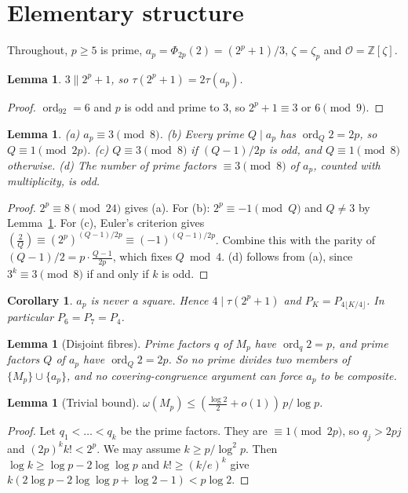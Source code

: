 \documentclass[11pt]{amsart}
\newtheorem{lemma}[theorem]{Lemma}
\newtheorem{corollary}[theorem]{Corollary}
\theoremstyle{definition}
\theoremstyle{remark}
\newcommand{\ord}{\operatorname{ord}}
\newcommand{\cO}{\mathcal{O}}
\newcommand{\Z}{\mathbb{Z}}
\begin{document}
\section{Elementary structure}
Throughout, $p\ge5$ is prime, $a_p=\Phi_{2p}(2)=(2^p+1)/3$, $\zeta=\zeta_p$ and $\cO=\Z[\zeta]$.

\begin{lemma}\label{lem:3part}
$3\parallel2^p+1$, so $\tau(2^p+1)=2\tau(a_p)$.
\end{lemma}
\begin{proof}
$\ord_92=6$ and $p$ is odd and prime to $3$, so $2^p+1\equiv3$ or $6\pmod9$.
\end{proof}

\begin{lemma}\label{lem:mod8}
(a) $a_p\equiv3\pmod8$. (b) Every prime $Q\mid a_p$ has $\ord_Q2=2p$, so $Q\equiv1\pmod{2p}$.
(c) $Q\equiv3\pmod8$ if $(Q-1)/2p$ is odd, and $Q\equiv1\pmod8$ otherwise.
(d) The number of prime factors $\equiv3\pmod8$ of $a_p$, counted with multiplicity, is odd.
\end{lemma}
\begin{proof}
$2^p\equiv8\pmod{24}$ gives (a). For (b): $2^p\equiv-1\pmod Q$ and $Q\ne3$ by Lemma~\ref{lem:3part}.
For (c), Euler's criterion gives $(\frac2Q)\equiv(2^p)^{(Q-1)/2p}\equiv(-1)^{(Q-1)/2p}$. Combine this with the parity
of $(Q-1)/2=p\cdot\frac{Q-1}{2p}$, which fixes $Q\bmod4$. (d) follows from (a), since $3^k\equiv3\pmod8$ if and only
if $k$ is odd.
\end{proof}

\begin{corollary}\label{cor:4div}
$a_p$ is never a square. Hence $4\mid\tau(2^p+1)$ and $P_K=P_{4\lfloor K/4\rfloor}$. In particular $P_6=P_7=P_4$.
\end{corollary}

\begin{lemma}[Disjoint fibres]\label{lem:fibres}
Prime factors $q$ of $M_p$ have $\ord_q2=p$, and prime factors $Q$ of $a_p$ have $\ord_Q2=2p$. So no prime divides
two members of $\{M_p\}\cup\{a_p\}$, and no covering-congruence argument can force $a_p$ to be composite.
\end{lemma}

\begin{lemma}[Trivial bound]\label{lem:trivial}
$\omega(M_p)\le(\frac{\log2}2+o(1))\,p/\log p$.
\end{lemma}
\begin{proof}
Let $q_1<\dots<q_k$ be the prime factors. They are $\equiv1\pmod{2p}$, so $q_j>2pj$ and $(2p)^kk!<2^p$. We may
assume $k\ge p/\log^2p$. Then $\log k\ge\log p-2\log\log p$ and $k!\ge(k/e)^k$ give
$k(2\log p-2\log\log p+\log 2-1)<p\log2$.
\end{proof}
\end{document}
